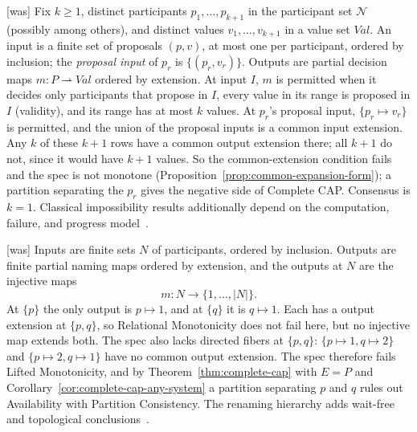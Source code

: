 \documentclass[sigconf]{cidr-2027}
\theoremstyle{remark}
\newcommand{\indesc}{input extension\xspace} %
\newcommand{\outnoun}{output extension\xspace}%
\begin{document}
{\footnotesize\color{black!50}\noindent\textsf{[was]} Fix $k\geq1$, distinct participants $p_1,\ldots,p_{k+1}$ in the participant set $\mathcal N$
(possibly among others), and distinct values $v_1,\ldots,v_{k+1}$ in a value
set $\mathit{Val}$.  An input is a finite set of proposals $(p,v)$, at most one
per participant, ordered by inclusion; the \emph{proposal input} of $p_r$ is
$\{(p_r,v_r)\}$.  Outputs are partial decision maps
$m:P\rightharpoonup\mathit{Val}$ ordered by extension.  At input $I$, $m$ is
permitted when it decides only participants that propose in $I$, every value
in its range is proposed in $I$ (validity), and its range has at most $k$
values.  At $p_r$'s proposal input, $\{p_r\mapsto v_r\}$ is permitted, and the
union of the proposal inputs is a common \indesc.  Any $k$ of these $k+1$
rows have a common \outnoun there; all $k+1$ do not, since it would have
$k+1$ values.  So the common-extension condition fails and the spec
is not monotone (Proposition~\ref{prop:common-expansion-form}); a partition
separating the $p_r$ gives the negative side of Complete CAP.  Consensus is
$k=1$.  Classical impossibility results additionally depend on the
computation, failure, and progress model~\cite{saks2000set}.\par}



{\footnotesize\color{black!50}\noindent\textsf{[was]} Inputs are finite sets $N$ of participants, ordered by inclusion.  Outputs are
finite partial naming maps ordered by extension, and the outputs at $N$ are
the injective maps
\begin{equation}
  m:N\longrightarrow\{1,\ldots,|N|\}.
\end{equation}
At $\{p\}$ the only output is $p\mapsto1$, and at $\{q\}$ it is $q\mapsto1$.
Each has a \outnoun at $\{p,q\}$, so Relational Monotonicity does not fail
here, but no injective map extends both.  The spec also lacks directed
fibers at
$\{p,q\}$: $\{p\mapsto1,q\mapsto2\}$ and $\{p\mapsto2,q\mapsto1\}$ have no
common \outnoun.  The spec therefore fails Lifted Monotonicity, and
by Theorem~\ref{thm:complete-cap} with $E=P$ and Corollary~\ref{cor:complete-cap-any-system} a partition separating $p$ and $q$ rules out
Availability with Partition Consistency.  The renaming hierarchy adds
wait-free and topological
conclusions~\cite{herlihy1991waitfree,herlihy1999topological}.\par}
\end{document}
